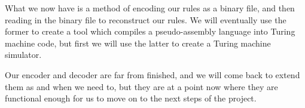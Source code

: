 What we now have is a method of encoding our rules as a binary file, and then reading in the binary file to reconstruct our rules. We will eventually use the former to create a tool which compiles a pseudo-assembly language into Turing machine code, but first we will use the latter to create a Turing machine simulator.

Our encoder and decoder are far from finished, and we will come back to extend them as and when we need to, but they are at a point now where they are functional enough for us to move on to the next steps of the project.
